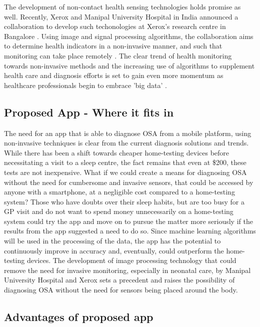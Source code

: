 The development of non-contact health sensing technologies holds promise as well. Recently, Xerox and Manipal University Hospital in India announced a collaboration to develop such techonologies at Xerox's research centre in Bangalore \cite{xerox1, xerox2}. Using image and signal processing algorithms, the collaboration aims to determine health indicators in a non-invasive manner, and such that monitoring can take place remotely \cite{xerox1}. The clear trend of health monitoring towards non-invasive methods and the increasing use of algorithms to supplement health care and diagnosis efforts is set to gain even more momentum as healthcare professionals begin to embrace 'big data' \cite{bigdata}.

\subsection{Proposed App - Where it fits in}

The need for an app that is able to diagnose OSA from a mobile platform, using non-invasive techniques is clear from the current diagnosis solutions and trends. While there has been a shift towards cheaper home-testing devices before necessitating a visit to a sleep centre, the fact remains that even at \$200, these tests are not inexpensive. What if we could create a means for diagnosing OSA without the need for cumbersome and invasive sensors, that could be accessed by anyone with a smartphone, at a negligible cost compared to a home-testing system? Those who have doubts over their sleep habits, but are too busy for a GP visit and do not want to spend money unnecessarily on a home-testing system could try the app and move on to pursue the matter more seriously if the results from the app suggested a need to do so. Since machine learning algorithms will be used in the processing of the data, the app has the potential to continuously improve in accuracy and, eventually, could outperform the home-testing devices. The development of image processing technology that could remove the need for invasive monitoring, especially in neonatal care, by Manipal University Hospital and Xerox sets a precedent and raises the possibility of diagnosing OSA without the need for sensors being placed around the body.


\subsection{Advantages of proposed app}

